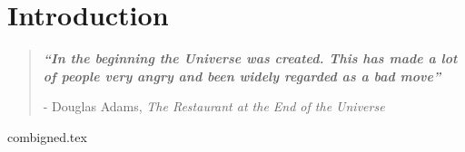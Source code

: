 

\chapter{ Introduction }\label{ch0}


\blankpage
\restoregeometry
\vspace*{0.15\paperheight}


\begin{center}
\begin{quotation}
  \large{\emph{\textbf{``In the beginning the Universe was created.
This has made a lot of people very angry and been widely regarded as a bad move''} }  }  \\
  \begin{flushright}
  - Douglas Adams, \textit{The Restaurant at the End of the Universe}
  \end{flushright}
 \end{quotation}
\end{center}
\doublespacing
\newpage

%










{combigned.tex}

\chapterbib

